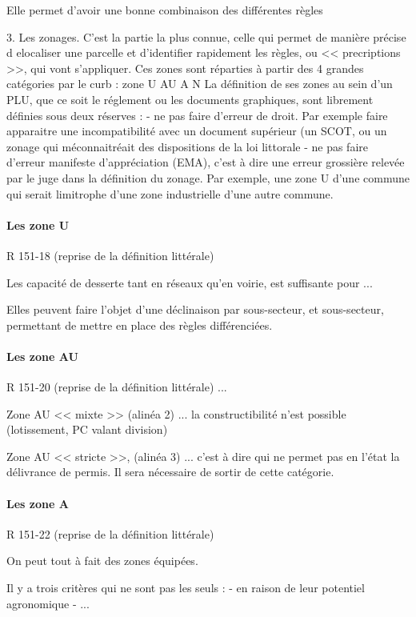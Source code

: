 		Elle permet d'avoir une bonne combinaison des différentes règles

		3. Les zonages. C'est la partie la plus connue, celle qui permet de manière précise d elocaliser une parcelle et d'identifier rapidement les règles, ou << precriptions >>, qui vont s'appliquer. Ces zones sont réparties à partir des 4 grandes catégories par le curb :
			zone U
			AU
			A
			N
		La définition de ses zones au sein d'un PLU, que ce soit le réglement ou les documents graphiques, sont librement définies sous deux réserves :
			- ne pas faire d'erreur de droit. Par exemple faire apparaitre une incompatibilité avec un document supérieur (un SCOT, ou un zonage qui méconnaitréait des dispositions de la loi littorale
			- ne pas faire d'erreur manifeste d'appréciation (EMA), c'est à dire une erreur grossière relevée par le juge dans la définition du zonage. Par exemple, une zone U d'une commune qui serait limitrophe d'une zone industrielle d'une autre commune.

		\paragraph{Les zone U} R 151-18 (reprise de la définition littérale)

			Les capacité de desserte tant en réseaux qu'en voirie, est suffisante pour ...

			Elles peuvent faire l'objet d'une déclinaison par sous-secteur, et sous-secteur, permettant de mettre en place des règles différenciées.

		\paragraph{Les zone AU} R 151-20 (reprise de la définition littérale) ...

			Zone AU << mixte >> (alinéa 2) ... la constructibilité n'est possible (lotissement, PC valant division)

			Zone AU << stricte >>, (alinéa 3) ... c'est à dire qui ne permet pas en l'état la délivrance de permis. Il sera nécessaire de sortir de cette catégorie.

		\paragraph{Les zone A} R 151-22 (reprise de la définition littérale)

			On peut tout à fait des zones équipées.

			Il y a trois critères qui ne sont pas les seuls :
			- en raison de leur potentiel agronomique
			- ...

